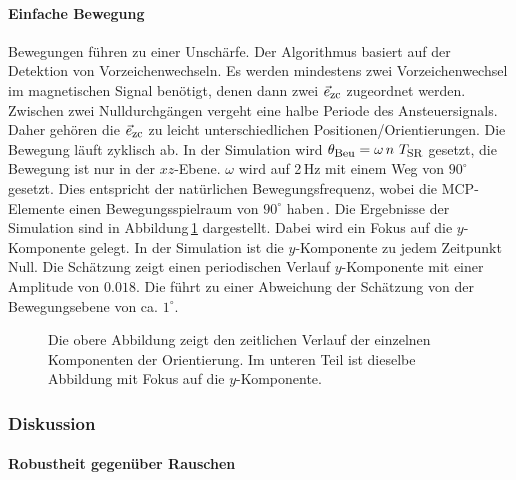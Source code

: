 \paragraph{Einfache Bewegung}
Bewegungen führen zu einer Unschärfe. Der Algorithmus basiert auf der Detektion von Vorzeichenwechseln. Es werden mindestens zwei Vorzeichenwechsel im magnetischen Signal benötigt, denen dann zwei $\vec{e}_{\textrm{\footnotesize{zc}}}$ zugeordnet werden. Zwischen zwei Nulldurchgängen vergeht eine halbe Periode des Ansteuersignals. Daher gehören die $\vec{e}_{\textrm{\footnotesize{zc}}}$ zu leicht unterschiedlichen Positionen/Orientierungen. Die Bewegung läuft zyklisch ab. In der Simulation wird $\theta_{\textrm{\footnotesize{Beu}}} = \omega\,n\, \,T_{\textrm{\footnotesize{SR}}}$ gesetzt, die Bewegung ist nur in der $xz$-Ebene. $\omega$ wird auf 2\,Hz mit einem Weg von $90^\circ$ gesetzt. Dies entspricht der natürlichen Bewegungsfrequenz\cite{hager-ross_quantifying_2000}, wobei die MCP-Elemente einen Bewegungsspielraum von $90^\circ$ haben\,\cite{lin_modeling_2000}. 
Die Ergebnisse der Simulation sind in Abbildung\,\ref{fig:SimpleMove} dargestellt. Dabei wird ein Fokus auf die $y$-Komponente gelegt. In der Simulation ist die $y$-Komponente zu jedem Zeitpunkt Null. Die Schätzung zeigt einen periodischen Verlauf $y$-Komponente mit einer Amplitude von  $0.018$. Die führt zu einer Abweichung der Schätzung von der Bewegungsebene von ca. $1^\circ$.

\begin{figure}[h]
  \centering
  \vspace{0.1mm}
  \caption{Die obere Abbildung zeigt den zeitlichen Verlauf der einzelnen Komponenten der Orientierung. Im unteren Teil ist dieselbe Abbildung mit Fokus auf die $y$-Komponente.} 
  \label{fig:SimpleMove}
\end{figure}


\subsubsection{Diskussion}
\paragraph{Robustheit gegenüber Rauschen}

